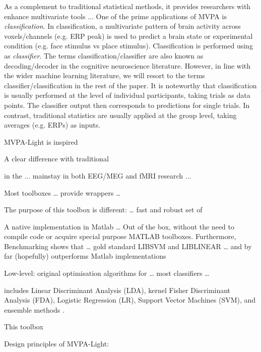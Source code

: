 \documentclass[utf8]{frontiersSCNS} %
\newcommand{\mvpa}{MVPA-Light}
\begin{document}
As a complement to traditional statistical methods, it provides researchers with enhance multivariate tools ... One of the prime applications of MVPA is \textit{classification}. In classification, a multivariate pattern of brain activity across voxels/channels (e.g. ERP peak) is used to predict a brain state or experimental condition (e.g. face stimulus vs place stimulus). Classification is performed using  as \textit{classifier}. The terms classification/classifier are also known as decoding/decoder in the cognitive neuroscience literature. However, in line with the wider machine learning literature, we will resort to the terms classifier/classification in the rest of the paper. It is noteworthy that classification is usually performed at the level of individual participants, taking trials as data points. The classifier output then corresponds to predictions for single trials. In contrast, traditional statistics are usually applied at the group level, taking averages (e.g. ERPs) as inputs.


\mvpa{}  is inspired


A clear difference with traditional


in the  ... mainstay in both EEG/MEG and fMRI research ...


Most toolboxes … provide wrappers …

The purpose of this toolbox is different: … fast and robust set of

A native implementation in Matlab …
Out of the box, without the need to compile code or acquire special purpose MATLAB toolboxes.
 Furthermore,
Benchmarking shows that … gold standard LIBSVM and LIBLINEAR … and by far (hopefully) outperforms Matlab implementations

Low-level: original optimisation algorithms for … most classifiers …

includes Linear Discriminant Analysis (LDA), kernel Fisher Discriminant Analysis (FDA), Logistic Regression (LR), Support Vector Machines (SVM), and ensemble methods \cite{Hastie2009}.

This toolbox


Design principles of \mvpa{}:
\end{document}
